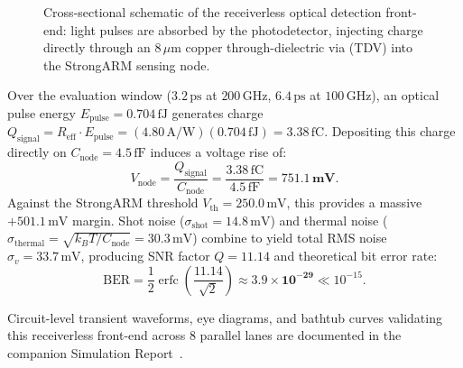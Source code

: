 \documentclass[journal]{IEEEtran}
\begin{document}
\begin{figure}[!t]
{
}
\caption{Cross-sectional schematic of the receiverless optical detection front-end: light pulses are absorbed by the photodetector, injecting charge directly through an $8\,\mu\text{m}$ copper through-dielectric via (TDV) into the StrongARM sensing node.}
\label{fig:receiverless_schematic}
\end{figure}

Over the evaluation window ($3.2\,\text{ps}$ at $200\,\text{GHz}$, $6.4\,\text{ps}$ at $100\,\text{GHz}$), an optical pulse energy $E_{\text{pulse}} = 0.704\,\text{fJ}$ generates charge $Q_{\text{signal}} = R_{\text{eff}} \cdot E_{\text{pulse}} = (4.80\,\text{A/W})(0.704\,\text{fJ}) = 3.38\,\text{fC}$. Depositing this charge directly on $C_{\text{node}} = 4.5\,\text{fF}$ induces a voltage rise of:
\begin{equation}
    V_{\text{node}} = \frac{Q_{\text{signal}}}{C_{\text{node}}} = \frac{3.38\,\text{fC}}{4.5\,\text{fF}} = \mathbf{751.1\,\text{mV}}.
\end{equation}
Against the StrongARM threshold $V_{\text{th}} = 250.0\,\text{mV}$, this provides a massive $+501.1\,\text{mV}$ margin. Shot noise ($\sigma_{\text{shot}} = 14.8\,\text{mV}$) and thermal noise ($\sigma_{\text{thermal}} = \sqrt{k_B T / C_{\text{node}}} = 30.3\,\text{mV}$) combine to yield total RMS noise $\sigma_v = 33.7\,\text{mV}$, producing SNR factor $Q = 11.14$ and theoretical bit error rate:
\begin{equation}
    \text{BER} = \frac{1}{2}\operatorname{erfc}\left(\frac{11.14}{\sqrt{2}}\right) \approx \mathbf{3.9 \times 10^{-29}} \ll 10^{-15}.
\end{equation}

Circuit-level transient waveforms, eye diagrams, and bathtub curves validating this receiverless front-end across 8 parallel lanes are documented in the companion Simulation Report~\cite{omi_sim_report}.
\end{document}
